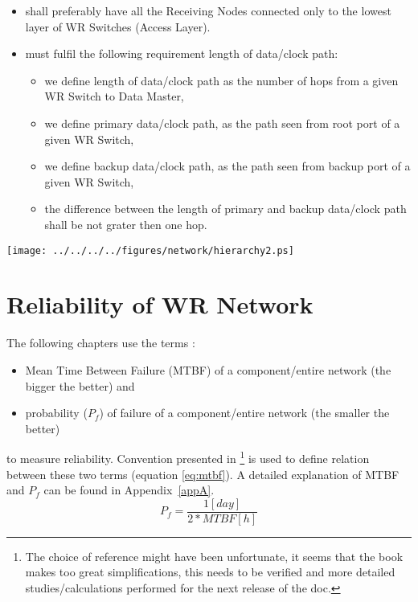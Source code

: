 \begin{itemize}
  \item shall preferably have all the Receiving Nodes connected only to the
	lowest layer of WR Switches (Access Layer).
  \item must fulfil the following requirement length of data/clock path: 
  \begin{itemize}
        \item we define length of data/clock path as the number of hops from a
	      given WR Switch to Data Master,	
        \item we define primary data/clock path, as the path seen from root
	      port of a given WR Switch,
        \item we define backup data/clock path, as the path seen from backup
	      port of a given WR Switch,
	\item the difference between the length of primary and backup data/clock
	      path shall be not grater then one hop.
  \end{itemize}
 
 \end{itemize}


\begin{center}
	\texttt{[image: ../../../../figures/network/hierarchy2.ps]}
	\label{fig:WRtopology}
\end{center}

\section{Reliability of WR Network}
\label{reliabilityOfNetwork}

The following chapters use the terms :
\begin{itemize}
  \item Mean Time Between Failure (MTBF) of a component/entire network (the
bigger the better) and
  \item probability ($P_f$) of failure of a component/entire network (the
smaller the better)
\end{itemize}
to measure reliability. Convention presented in \cite{DesigningLSLANs}
\footnote{The choice of reference might have been unfortunate, it seems that
the book makes too great simplifications, this needs to be verified and more
detailed studies/calculations performed for the next release of the doc.} is
used to define relation between these two terms (equation \ref{eq:mtbf}). A
detailed
explanation of MTBF and $P_f$ can be found in Appendix~\ref{appA}. 
	\begin{equation}
        \label{eq:mtbf}
		P_f= \frac{1 [day]}{2*MTBF [h]}  
	\end{equation}

